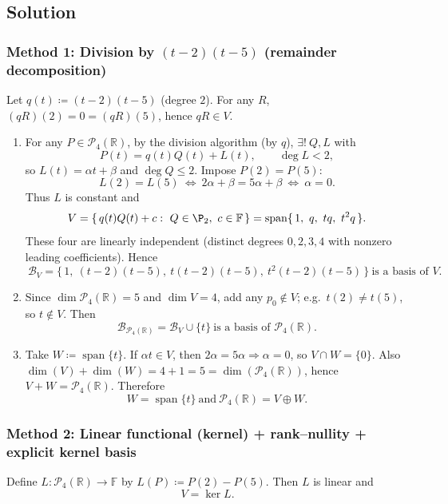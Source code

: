 \documentclass[12pt]{article}
\newcommand{\F}{\mathbb{F}}
\newcommand{\R}{\mathbb{R}}
\newcommand{\Span}{\operatorname{span}}
\newcommand{\Pfour}{\mathcal{P}_4(\R)}
\begin{document}
\subsection{Solution}

\subsubsection{Method 1: Division by \((t-2)(t-5)\) (remainder decomposition)}
Let \(q(t)\coloneqq (t-2)(t-5)\) (degree \(2\)). For any \(R\), \((qR)(2)=0=(qR)(5)\), hence \(qR\in V\).

\begin{enumerate}[label=(\alph*)]
\item For any \(P\in \Pfour\), by the division algorithm (by \(q\)), \(\exists!\ Q,L\) with
\[
P(t)=q(t)Q(t)+L(t),\qquad \deg L<2,
\]
so \(L(t)=\alpha t+\beta\) and \(\deg Q\le 2\). Impose \(P(2)=P(5)\):
\[
L(2)=L(5)\ \Longleftrightarrow\ 2\alpha+\beta=5\alpha+\beta\ \Longleftrightarrow\ \alpha=0.
\]
Thus \(L\) is constant and
\[
V=\{\,q(t)Q(t)+c:\ Q\in \P_2,\ c\in \F\,\}
=\Span\{\,1,\ q,\ tq,\ t^2q\,\}.
\]
These four are linearly independent (distinct degrees \(0,2,3,4\) with nonzero leading coefficients). Hence
\[
\boxed{\ \mathcal B_V=\{\,1,\ (t-2)(t-5),\ t(t-2)(t-5),\ t^2(t-2)(t-5)\,\}\ \text{is a basis of }V.\ }
\]

\item Since \(\dim \Pfour=5\) and \(\dim V=4\), add any \(p_0\notin V\); e.g.\ \(t(2)\ne t(5)\), so \(t\notin V\). Then
\[
\boxed{\ \mathcal B_{\Pfour}=\mathcal B_V\cup\{t\}\ \text{is a basis of }\Pfour.\ }
\]

\item Take \(W\coloneqq \Span\{t\}\). If \(\alpha t\in V\), then \(2\alpha=5\alpha\Rightarrow \alpha=0\), so \(V\cap W=\{0\}\).
Also \(\dim(V)+\dim(W)=4+1=5=\dim(\Pfour)\), hence \(V+W=\Pfour\). Therefore
\[
\boxed{\ W=\Span\{t\}\ \text{and}\ \Pfour=V\oplus W.\ }
\]
\end{enumerate}

\subsubsection{Method 2: Linear functional (kernel) + rank--nullity + explicit kernel basis}
Define \(L:\Pfour\to\F\) by \(L(P)\coloneqq P(2)-P(5)\). Then \(L\) is linear and
\[
V=\ker L.
\]
\end{document}
